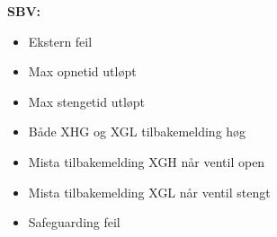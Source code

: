 \textbf{SBV:}
    \begin{itemize}
        \item Ekstern feil
        \item Max opnetid utløpt
        \item Max stengetid utløpt
        \item Både XHG og XGL tilbakemelding høg
        \item Mista tilbakemelding XGH når ventil open
        \item Mista tilbakemelding XGL når ventil stengt
        \item Safeguarding feil
    \end{itemize}

\newpage